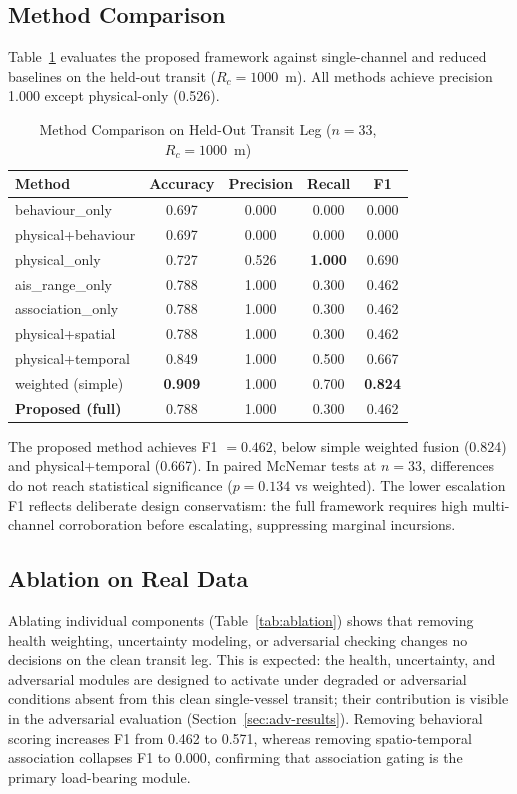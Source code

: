 \documentclass[conference]{IEEEtran}
\begin{document}
\subsection{Method Comparison}
Table~\ref{tab:methods} evaluates the proposed framework against single-channel
and reduced baselines on the held-out transit ($R_c = 1000$~m). All methods
achieve precision 1.000 except physical-only (0.526).

\begin{table}[!t]
\caption{Method Comparison on Held-Out Transit Leg ($n=33$, $R_c=1000$~m)}
\label{tab:methods}
\centering
\footnotesize
\begin{tabular}{@{}lcccc@{}}
\toprule
Method & Accuracy & Precision & Recall & F1 \\
\midrule
behaviour\_only & 0.697 & 0.000 & 0.000 & 0.000 \\
physical+behaviour & 0.697 & 0.000 & 0.000 & 0.000 \\
physical\_only & 0.727 & 0.526 & \textbf{1.000} & 0.690 \\
ais\_range\_only & 0.788 & 1.000 & 0.300 & 0.462 \\
association\_only & 0.788 & 1.000 & 0.300 & 0.462 \\
physical+spatial & 0.788 & 1.000 & 0.300 & 0.462 \\
physical+temporal & 0.849 & 1.000 & 0.500 & 0.667 \\
weighted (simple) & \textbf{0.909} & 1.000 & 0.700 & \textbf{0.824} \\
\textbf{Proposed (full)} & 0.788 & 1.000 & 0.300 & 0.462 \\
\bottomrule
\end{tabular}
\end{table}

The proposed method achieves F1 $= 0.462$, below simple weighted fusion (0.824)
and physical+temporal (0.667). In paired McNemar tests at $n=33$, differences
do not reach statistical significance ($p = 0.134$ vs weighted). The lower
escalation F1 reflects deliberate design conservatism: the full framework
requires high multi-channel corroboration before escalating, suppressing
marginal incursions.

\subsection{Ablation on Real Data}
Ablating individual components (Table~\ref{tab:ablation}) shows that removing
health weighting, uncertainty modeling, or adversarial checking changes no
decisions on the clean transit leg. This is expected: the health, uncertainty,
and adversarial modules are designed to activate under degraded or adversarial
conditions absent from this clean single-vessel transit; their contribution is
visible in the adversarial evaluation (Section~\ref{sec:adv-results}).
Removing behavioral scoring increases F1 from 0.462 to 0.571, whereas removing
spatio-temporal association collapses F1 to 0.000, confirming that association
gating is the primary load-bearing module.
\end{document}
